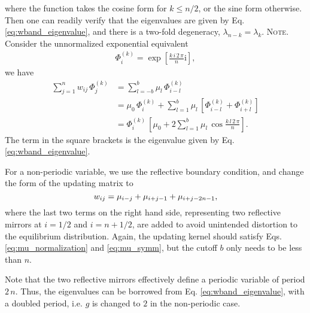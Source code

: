 \documentclass[reprint, superscriptaddress, floatfix]{revtex4-1}
\newcommand{\note}[1]{{\color{DarkGreen}\footnotesize \textsc{Note.} #1}}
\newcommand{\ii}{\mathrm{i}}
\begin{document}
%
where the function takes the cosine form for $k \le n/2$,
or the sine form otherwise.
%
Then one can readily verify that the eigenvalues are given by
  Eq. \eqref{eq:wband_eigenvalue},
  and there is a two-fold degeneracy,
  $\lambda_{n - k} = \lambda_k$.
\note{Consider the unnormalized exponential equivalent
  \begin{align*}
  \Phi^{(k)}_i =
  \exp\left[
    \frac{ k \, i \, 2 \, \pi }
         {      n             }
    \ii
  \right]
  ,
  \end{align*}
  we have
  \begin{align*}
  \sum_{j = 1}^n
    w_{ij} \, \Phi^{(k)}_j
  &=
  \sum_{l = -b}^b
    \mu_l \, \Phi^{(k)}_{i - l}
  \\
  &=
  \mu_0 \, \Phi^{(k)}_i
  +
  \sum_{l = 1}^b
    \mu_l \,
    \left[ \Phi^{(k)}_{i - l} + \Phi^{(k)}_{i + l} \right]
  \\
  &=
  \Phi^{(k)}_i \,
  \left[
    \mu_0
    +
    2 \sum_{l = 1}^b
      \mu_l \, \cos
      \frac{ k \, l \, 2 \, \pi }
           {      n             }
  \right]
  .
  \end{align*}
  The term in the square brackets is the eigenvalue given by
  Eq. \eqref{eq:wband_eigenvalue}.
}
%


For a non-periodic variable,
we use the reflective boundary condition\cite{bussi2006},
and change the form of the updating matrix to
%
%
\begin{equation}
  w_{ij}
  =
  \mu_{ i - j }
  +
  \mu_{ i + j - 1 }
  +
  \mu_{ i + j - 2 n - 1 }
  ,
  \notag
  \label{eq:w_band_refl}
\end{equation}
%
where the last two terms on the right hand side,
representing two reflective mirrors at
$i = 1/2$ and $i = n + 1/2$,
are added to avoid unintended distortion\cite{dickson2011, mcgovern2013}
to the equilibrium distribution\cite{bussi2006}.
%
Again, the updating kernel should satisfy
Eqs. \eqref{eq:mu_normalization}
and \eqref{eq:mu_symm},
but
the cutoff $b$ only needs to be less than $n$.

Note that the two reflective mirrors effectively
define a periodic variable of period $2 \, n$.
Thus, the eigenvalues can be borrowed from
Eq. \eqref{eq:wband_eigenvalue},
with a doubled period,
i.e. $g$ is changed to $2$ in the non-periodic case.

\end{document}
